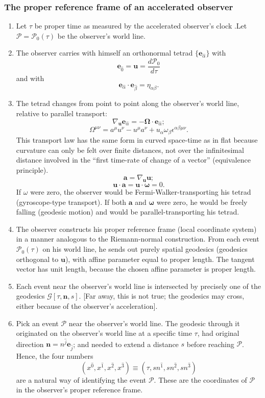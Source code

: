 \subsubsection{The proper reference frame of an accelerated observer}
\begin{enumerate}
\item Let $\tau$ be proper time as measured by the accelerated observer's clock .Let $\mathcal{P} = \mathcal{P}_0(\tau)$ be the observer's world line.
\item The observer carries with himself an orthonormal tetrad $\{\bm{e}_{\hat{\alpha}}\}$
with
\[\bm{e}_{\hat{0}} = \bm{u} = \frac{d \mathcal{P}_0}{d \tau} \]
and with
\[\bm{e}_{\hat{\alpha}} \cdot \bm{e}_{\hat{\beta}} = \eta_{\alpha \beta}.\]
\item The tetrad changes from point to point along the observer's world line, relative to parallel transport:
\[\nabla_{\bm{u}} \bm{e}_{\hat{\alpha}} = - \bm{\Omega} \cdot \bm{e}_{\hat{\alpha}} ;\]
\[\Omega^{\mu \nu} = a^{\mu} u^{\nu} - u^{\mu} a^{\nu} + u_{\alpha} \omega_{\beta}\epsilon^{\alpha \beta \mu \nu}.\]
This transport law has the same form in curved space-time as in flat because curvature can only be felt over finite distances, not over
the infinitesimal distance involved in the ``first time-rate of change of a vector'' (equivalence principle).
\[\bm{a} = \nabla_{\bm{u}} \bm{u};\]
\[\bm{u} \cdot \bm{a} = \bm{u} \cdot \bm{\omega} = 0.\]
If $\omega$ were zero, the observer would be Fermi-Walker-transporting his tetrad (gyroscope-type transport). If both $\bm{a}$ and $\bm{\omega}$ were zero, he would be freely falling (geodesic motion) and would be parallel-transporting his tetrad.
\item The observer constructs his proper reference frame (local coordinate system) in a manner analogous to the Riemann-normal construction. From each event $\mathcal{P}_0(\tau)$ on his world line, he sends out purely spatial geodesics (geodesics orthogonal to $\bm{u}$), with affine parameter equal to proper length. The tangent vector has unit length, because the chosen affine
parameter is proper length.
\item Each event near the observer's world line is intersected by precisely one of the geodesics $\mathcal{G}[\tau,\bm{n},s]$. [Far away, this is not true; the geodesics may cross, either
because of the observer's acceleration].
\item Pick an event $\mathcal{P}$ near the observer's world line. The geodesic through it originated on the observer's world line at a specific time $\tau$, had original direction $\bm{n} = n^{\hat{j}} \bm{e}_{\hat{j}}$; and needed to extend a distance $s$ before reaching $\mathcal{P}$. Hence, the four numbers
\[(x^{\hat{0}},x^{\hat{1}},x^{\hat{2}},x^{\hat{3}}) \equiv (\tau,s n^{\hat{1}},s n^{\hat{2}},s n^{\hat{3}})\]
are a natural way of identifying the event $\mathcal{P}$. These are the coordinates of $\mathcal{P}$ in the observer's proper reference frame.
\end{enumerate}
